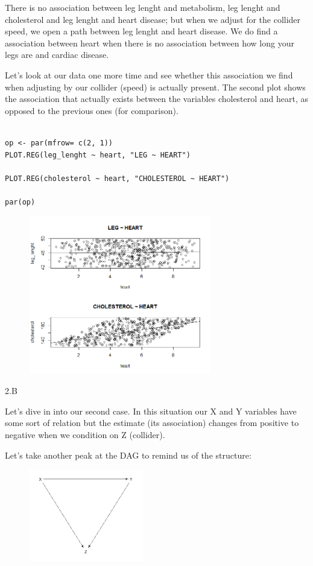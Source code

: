 \documentclass{article}
\begin{document}
There is no association between leg lenght and metabolism, leg lenght and  cholesterol and leg lenght and heart disease; but when we adjust for the  collider speed, we open a path between leg lenght and heart disease. We  do find  a association between heart when there is no association between  how long your legs are and cardiac disease.

Let's look at our data one more time and see whether this association we find when adjusting by our collider (speed) is actually present. The second plot shows the association that actually exists between the variables cholesterol and heart, as opposed to the previous ones (for comparison).


\begin{lstlisting}

op <- par(mfrow= c(2, 1))
PLOT.REG(leg_lenght ~ heart, "LEG ~ HEART")

PLOT.REG(cholesterol ~ heart, "CHOLESTEROL ~ HEART")

par(op)
\end{lstlisting}

\begin{figure}[h]
\includegraphics[width=8cm]{COMP_LEG_CHOL_HEART.png}
\centering
\end{figure}
\newpage


\bigskip
2.B
\smallskip

Let's dive in into our second case. In this situation our X and Y variables have some sort of relation but the estimate (its association) changes from positive to negative when we condition on Z (collider).
\smallskip

Let's take another peak at the DAG to remind us of the structure:

\begin{figure}[h]
\includegraphics[width=5cm]{DAG_Situation2.png}
\centering
\end{figure}
\end{document}
